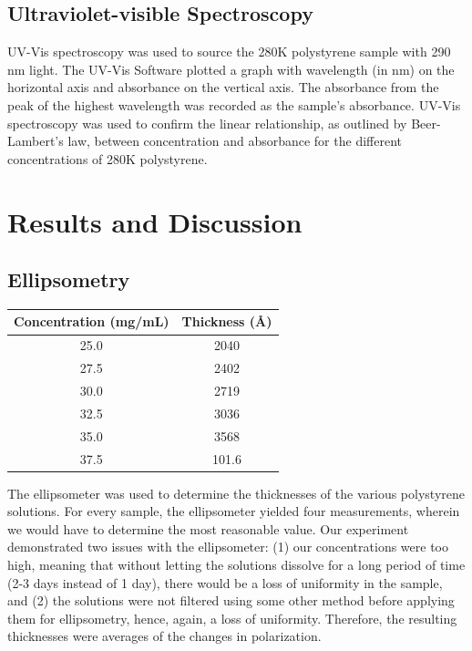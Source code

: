 \documentclass[twocolumn]{article}
\begin{document}
            \subsection{Ultraviolet-visible Spectroscopy}
                UV-Vis spectroscopy was used to source the 280K polystyrene sample with 290 nm light. The UV-Vis Software plotted a graph with wavelength (in nm) on the horizontal axis and absorbance on the vertical axis. The absorbance from the peak of the highest wavelength was recorded as the sample’s absorbance. UV-Vis spectroscopy was used to confirm the linear relationship, as outlined by Beer-Lambert’s law, between concentration and absorbance for the different concentrations of 280K polystyrene.

        \section{Results and Discussion}
            \subsection{Ellipsometry}

                \begin{table}
                    \centering
                        \begin{tabular}{@{}cc@{}}
                            \toprule
                            Concentration (mg/mL) & Thickness (Å) \\ \midrule
                            25.0                  & 2040          \\
                            27.5                  & 2402          \\
                            30.0                  & 2719          \\
                            32.5                  & 3036          \\
                            35.0                  & 3568          \\
                            37.5                  & 101.6         \\ \bottomrule
                        \end{tabular}
                \end{table}

                The ellipsometer was used to determine the thicknesses of the various polystyrene solutions. For every sample, the ellipsometer yielded four measurements, wherein we would have to determine the most reasonable value. Our experiment demonstrated two issues with the ellipsometer: (1) our concentrations were too high, meaning that without letting the solutions dissolve for a long period of time (2-3 days instead of 1 day), there would be a loss of uniformity in the sample, and (2) the solutions were not filtered using some other method before applying them for ellipsometry, hence, again, a loss of uniformity. Therefore, the resulting thicknesses were averages of the changes in polarization.
\end{document}
